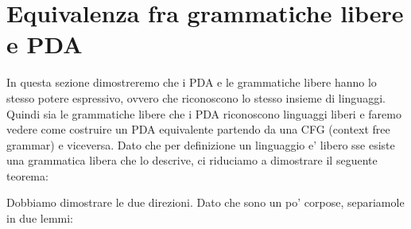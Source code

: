 \section{Equivalenza fra grammatiche libere e PDA}
In questa sezione dimostreremo che i PDA e le grammatiche libere hanno lo stesso potere espressivo, ovvero che riconoscono lo stesso insieme di linguaggi. Quindi sia le grammatiche libere che i PDA riconoscono linguaggi liberi e faremo vedere come costruire un PDA equivalente partendo da una CFG (context free grammar) e viceversa. Dato che per definizione un linguaggio e' libero sse esiste una grammatica libera che lo descrive, ci riduciamo a dimostrare il seguente teorema:

Dobbiamo dimostrare le due direzioni. Dato che sono un po' corpose, separiamole in due lemmi:
